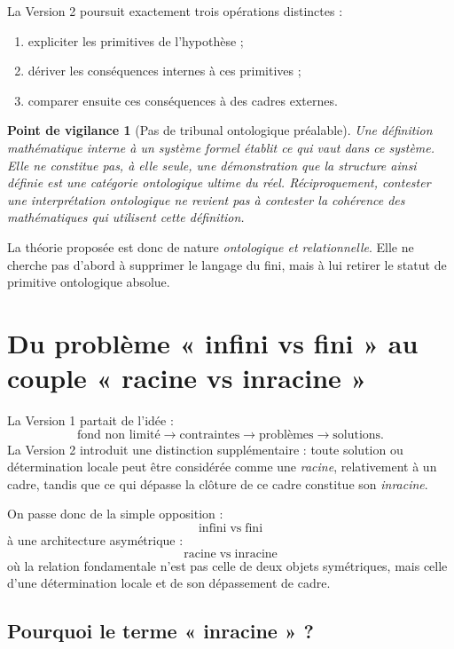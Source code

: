 \documentclass[11pt,a4paper]{article}
\newtheorem{warning}{Point de vigilance}[section]
\begin{document}
La Version 2 poursuit exactement trois opérations distinctes :
\begin{enumerate}
    \item expliciter les primitives de l'hypothèse ;
    \item dériver les conséquences internes à ces primitives ;
    \item comparer ensuite ces conséquences à des cadres externes.
\end{enumerate}

\begin{warning}[Pas de tribunal ontologique préalable]
Une définition mathématique interne à un système formel établit ce qui vaut
dans ce système. Elle ne constitue pas, à elle seule, une démonstration que
la structure ainsi définie est une catégorie ontologique ultime du réel.
Réciproquement, contester une interprétation ontologique ne revient pas à
contester la cohérence des mathématiques qui utilisent cette définition.
\end{warning}

La théorie proposée est donc de nature \emph{ontologique et relationnelle}.
Elle ne cherche pas d'abord à supprimer le langage du fini, mais à lui retirer
le statut de primitive ontologique absolue.

\section{Du problème « infini vs fini » au couple « racine vs inracine »}

La Version 1 partait de l'idée :
\[
\text{fond non limité}
\to
\text{contraintes}
\to
\text{problèmes}
\to
\text{solutions}.
\]
La Version 2 introduit une distinction supplémentaire : toute solution ou
détermination locale peut être considérée comme une \emph{racine}, relativement
à un cadre, tandis que ce qui dépasse la clôture de ce cadre constitue son
\emph{inracine}.

On passe donc de la simple opposition :
\[
\text{infini}\;\text{vs}\;\text{fini}
\]
à une architecture asymétrique :
\[
\boxed{
\text{racine}\;\text{vs}\;\text{inracine}
}
\]
où la relation fondamentale n'est pas celle de deux objets symétriques, mais
celle d'une détermination locale et de son dépassement de cadre.

\subsection{Pourquoi le terme « inracine » ?}
\end{document}

